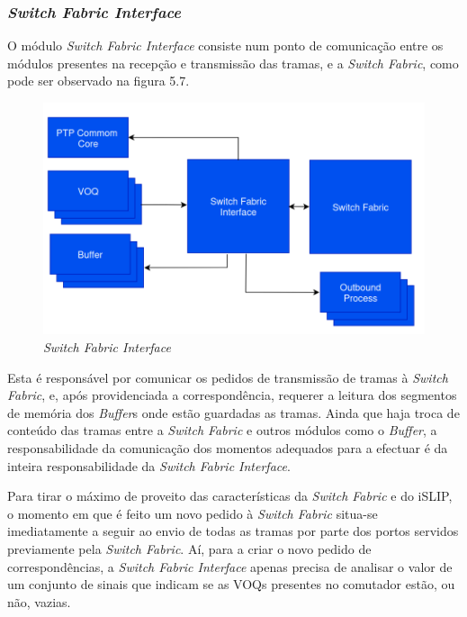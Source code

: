 \subsubsection{\textit{Switch Fabric Interface}}

O módulo \textit{Switch Fabric Interface} consiste num ponto de comunicação entre os módulos presentes na recepção e transmissão das tramas, e a \textit{Switch Fabric}, como pode ser observado na figura 5.7.

\begin{figure}[H]
  \centering
  \includegraphics[width=1 \textwidth]{Interface_Fabric.png}
  \caption[\textit{Switch Fabric Interface}]{\textit{Switch Fabric Interface}}
  \label{fig:airbus1}
\end{figure} 


Esta é responsável por comunicar os pedidos de transmissão de tramas à \textit{Switch Fabric}, e, após providenciada a correspondência, requerer a leitura dos segmentos de memória dos \textit{Buffer}s onde estão guardadas as tramas. Ainda que haja troca de conteúdo das tramas entre a \textit{Switch Fabric} e outros módulos como o \textit{Buffer}, a responsabilidade da comunicação dos momentos adequados para a efectuar é da inteira responsabilidade da \textit{Switch Fabric Interface}.   \par
Para tirar o máximo de proveito das características da \textit{Switch Fabric} e do iSLIP, o momento em que é feito um novo pedido à \textit{Switch Fabric} situa-se imediatamente a seguir ao envio de todas as tramas por parte dos portos servidos previamente pela \textit{Switch Fabric}. Aí, para a criar o novo pedido de correspondências, a \textit{Switch Fabric Interface} apenas precisa de analisar o valor de um conjunto de sinais que indicam se as VOQs presentes no comutador estão, ou não, vazias.  


